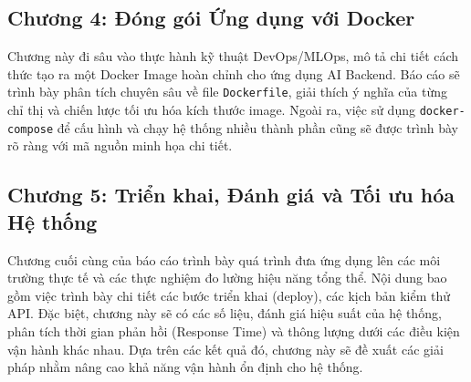 \subsection*{Chương 4: Đóng gói Ứng dụng với Docker}
Chương này đi sâu vào thực hành kỹ thuật DevOps/MLOps, mô tả chi tiết cách thức tạo ra một Docker Image hoàn chỉnh cho ứng dụng AI Backend. Báo cáo sẽ trình bày phân tích chuyên sâu về file \texttt{Dockerfile}, giải thích ý nghĩa của từng chỉ thị và chiến lược tối ưu hóa kích thước image. Ngoài ra, việc sử dụng \texttt{docker-compose} để cấu hình và chạy hệ thống nhiều thành phần cũng sẽ được trình bày rõ ràng với mã nguồn minh họa chi tiết.

\subsection*{Chương 5: Triển khai, Đánh giá và Tối ưu hóa Hệ thống}
Chương cuối cùng của báo cáo trình bày quá trình đưa ứng dụng lên các môi trường thực tế và các thực nghiệm đo lường hiệu năng tổng thể. Nội dung bao gồm việc trình bày chi tiết các bước triển khai (deploy), các kịch bản kiểm thử API. Đặc biệt, chương này sẽ có các số liệu, đánh giá hiệu suất của hệ thống, phân tích thời gian phản hồi (Response Time) và thông lượng dưới các điều kiện vận hành khác nhau. Dựa trên các kết quả đó, chương này sẽ đề xuất các giải pháp nhằm nâng cao khả năng vận hành ổn định cho hệ thống.
